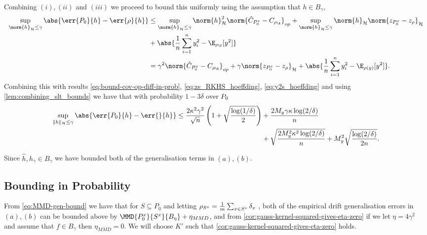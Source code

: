 Combining \((i), (ii)\) and \((iii)\) we proceed to bound this uniformly using
the assumption that \(h \in B_{\gamma}\),
\begin{align*}
  \sup_{\norm{h}_{\rkhs{H}} \leq \gamma} \abs{\err{\poolset_0}{h} - \err{\rho}{h}}  & \leq \sup_{\norm{h}_{\rkhs{H}} \leq \gamma} \norm{h}_{\rkhs{H}}^2\norm{\hat{C}_{\poolsetx_0} - C_{\rho_{\X}}}_{op}  + \sup_{\norm{h}_{\rkhs{H}} \leq \gamma} \norm{h}_{\rkhs{H}} \norm{z_{\poolsetx_0} - z_{\rho}}_{\rkhs{H}} \\
                                                                                    & + \abs{\frac{1}{n} \sum_{i=1}^n y_i^2 - \E_{\rho_{\Y}}[y^2]} \\
                                                                                    & = \gamma^2 \norm{\hat{C}_{\poolsetx_0} - C_{\rho_{\X}}}_{op} + \gamma \norm{z_{\poolsetx_0} - z_{\rho}}_{\rkhs{H}} + \abs{\frac{1}{n} \sum_{i=1}^n y_i^2 - \E_{\rho(y)}[y^2]}.
\end{align*}
Combining this with results
\ref{eq:bound-cov-op-diff-in-prob}, \ref{eq:zs_RKHS_hoeffding},
\ref{eq:y2s_hoeffding} and using \ref{lem:combining_slt_bounds} we have that with probability \(1 - 3\delta\) over \(P_0\)
\begin{equation}
\label{eq:uniform-bound-gen-error-over-ball}
\begin{split}
  \sup_{\|h\|_{\rkhs{H}} \leq \gamma} \abs{\err{\poolset_0}{h} -\err{}{h}} \leq
  \frac{2 \kappa^2 \gamma^2}{\sqrt{n}}  \left(1 + \sqrt{\frac{\log(1 / \delta)}{2}} \right) & + \frac{2 M_y \gamma \kappa \log(2/\delta)}{n}  \\
  & + \sqrt{\frac{2 M_y^2 \kappa^2 \log(2/\delta)}{n}} + M_y^2\sqrt{\frac{\log(2/\delta)}{2n}}.
\end{split}
\end{equation}

Since \(\hat{h}, h_{\gamma} \in B_{\gamma}\) we have bounded both of the
generalisation terms in \((a), (b)\).

\subsection{Bounding in Probability}
From \ref{eq:MMD-gen-bound} we have that for \(S \subseteq P_{0}\) and
letting \(\rho_{S^x} = \frac{1}{m} \sum_{x \in S^x}\delta_{x}\)
, both of the empirical drift generalisation errors in \((a), (b)\) can be
bounded above by \(\MMD{\poolsetx_{0}}{\trainsetx}{B_{\eta}} + \eta_{MMD}\),
and from \ref{cor:gauss-kernel-squared-gives-eta-zero} if we let \(\eta =
4\gamma^{2}\) and assume that \(f \in B_{\gamma}\) then \(\eta_{MMD} = 0\). We will choose \(K'\) such that
\ref{cor:gauss-kernel-squared-gives-eta-zero} holds.


